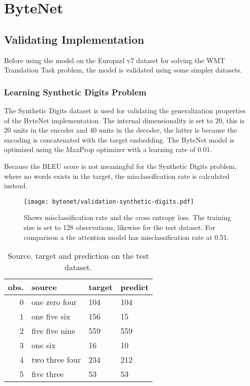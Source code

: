 
\section{ByteNet}

\subsection{Validating Implementation}

Before using the model on the Europarl v7 dataset for solving the WMT Translation Task problem, the model is validated using some simpler datasets.

\subsubsection{Learning Synthetic Digits Problem}

The Synthetic Digits dataset is used for validating the generalization properties of the ByteNet implementation. The internal dimensionality is set to 20, this is 20 units in the encoder and 40 units in the decoder, the latter is because the encoding is concatenated with the target embedding. The ByteNet model is optimized using the MaxProp optimizer with a learning rate of 0.01.

Because the BLEU score is not meaningful for the Synthetic Digits problem, where no words exists in the target, the misclassification rate is calculated instead.

\begin{figure}[H]
    \centering
    \texttt{[image: bytenet/validation-synthetic-digits.pdf]}
    \caption{Shows misclassification rate and the cross entropy loss. The training size is set to 128 observations, likewise for the test dataset. For comparison a the attention model has misclassification rate at 0.51.}
\end{figure}

\begin{table}[h]
\centering
\begin{tabular}{r|p{3.3cm} p{3.3cm} p{3.3cm}}
	obs. & source & target & predict\\ \hline
  0 & one zero four & 104 & 104 \\
  1 & one five six & 156 & 15 \\
  2 & five five nine & 559 & 559 \\
  3 & one six & 16 & 10 \\
  4 & two three four & 234 & 212 \\
  5 & five three & 53 & 53
\end{tabular}
\caption{Source, target and prediction on the test dataset.}
\end{table}

